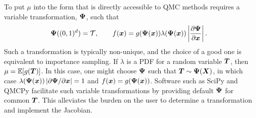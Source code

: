 \documentclass[graybox]{svmult}
\begin{document}
To put $\mu$ into the form that is directly accessible to QMC methods requires a variable transformation, ${\boldsymbol{\Psi}}$, such that
\begin{equation*}
    {\boldsymbol{\Psi}}((0,1)^d) = {\mathcal{T}}, \qquad f({\boldsymbol{x}}) = g({\boldsymbol{\Psi}}({\boldsymbol{x}})) \lambda({\boldsymbol{\Psi}}({\boldsymbol{x}})) \left\vert\frac{\partial {\boldsymbol{\Psi}}}{\partial{\boldsymbol{x}}}\right\vert.
\end{equation*}
Such a transformation is typically non-unique, and the choice of a good one is equivalent to importance sampling.  If $\lambda$ is a PDF for a random variable ${\boldsymbol{T}}$, then $\mu = {\mathbb{E}}[g({\boldsymbol{T}})]$.  In this case, one might choose ${\boldsymbol{\Psi}}$ such that ${\boldsymbol{T}} \sim {\boldsymbol{\Psi}}({\boldsymbol{X}})$, in which case $\lambda({\boldsymbol{\Psi}}({\boldsymbol{x}})) \left\vert\partial {\boldsymbol{\Psi}}/\partial{\boldsymbol{x}}\right\vert = 1$ and $f({\boldsymbol{x}}) = g({\boldsymbol{\Psi}}({\boldsymbol{x}}))$. Software such as SciPy and QMCPy facilitate such variable transformations by providing default ${\boldsymbol{\Psi}}$ for common ${\boldsymbol{T}}$. This alleviates the burden on the user to determine a transformation and implement the Jacobian.
\end{document}
